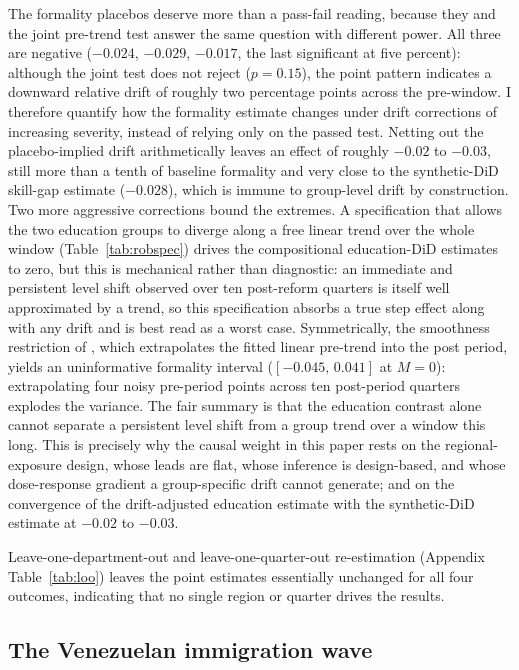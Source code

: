 The formality placebos deserve more than a pass-fail reading, because they and the joint
pre-trend test answer the same question with different power. All three are negative
($-0.024$, $-0.029$, $-0.017$, the last significant at five percent): although the joint
test does not reject ($p=0.15$), the point pattern indicates a downward relative drift of
roughly two percentage points across the pre-window. I therefore quantify how the
formality estimate changes under drift corrections of increasing severity, instead of
relying only on the passed test. Netting out the placebo-implied drift arithmetically leaves
an effect of roughly $-0.02$ to $-0.03$, still more than a tenth of baseline formality
and very close to the synthetic-DiD skill-gap estimate ($-0.028$), which is immune
to group-level drift by construction. Two more aggressive corrections bound the extremes.
A specification that allows the two education groups to diverge along a free linear trend
over the whole window (Table~\ref{tab:robspec}) drives the compositional education-DiD
estimates to zero, but this is mechanical rather than diagnostic: an immediate and persistent
level shift observed over ten post-reform quarters is itself well approximated by a
trend, so this specification absorbs a true step effect along with any drift and is best
read as a worst case. Symmetrically, the smoothness restriction of
\citet{rambachan_roth_2023}, which extrapolates the fitted linear pre-trend into the post
period, yields an uninformative formality interval ($[-0.045,\,0.041]$ at $M=0$):
extrapolating four noisy pre-period points across ten post-period quarters explodes the
variance. The fair summary is that the education contrast alone cannot separate a
persistent level shift from a group trend over a window this long. This is precisely
why the causal weight in this paper rests on the regional-exposure design, whose leads
are flat, whose inference is design-based, and whose dose-response gradient a
group-specific drift cannot generate; and on the convergence of the drift-adjusted
education estimate with the synthetic-DiD estimate at $-0.02$ to $-0.03$.

Leave-one-department-out and leave-one-quarter-out re-estimation
(Appendix Table~\ref{tab:loo}) leaves the point estimates essentially unchanged for all
four outcomes, indicating that no single region or quarter drives the results.

\subsection{The Venezuelan immigration wave}

